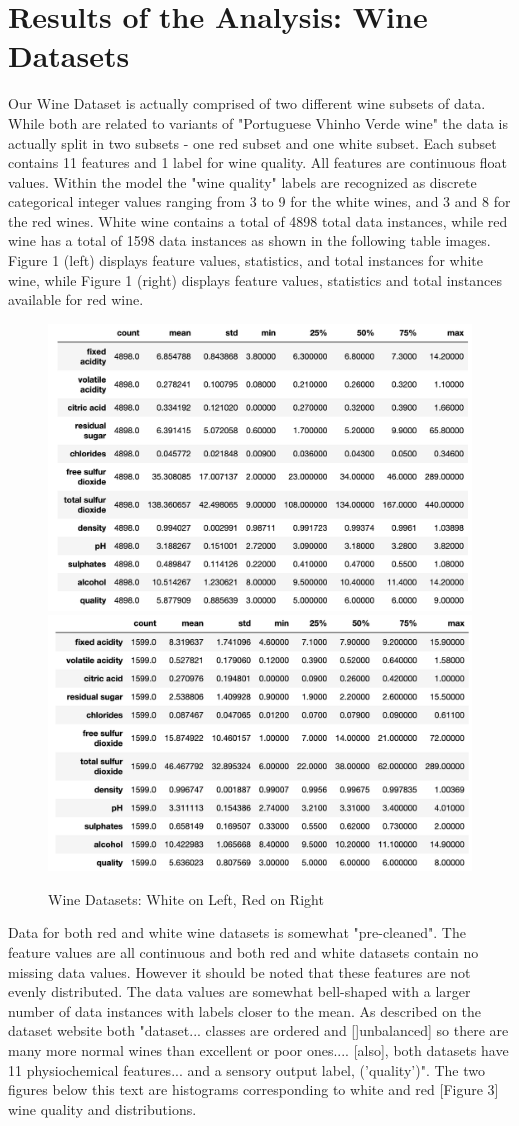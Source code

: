 \documentclass[titlepage]{article}
\begin{document}
\section*{Results of the Analysis: Wine Datasets}
Our Wine Dataset is actually comprised of two different wine subsets of data.  While both are related to variants of \cite{dataset2} "Portuguese Vhinho Verde wine" the data is actually split in two subsets - one red subset and one white subset.  Each subset contains 11 features and 1 label for wine quality.   All features are continuous float values.  Within the model the "wine quality" labels are recognized as discrete categorical integer values ranging from 3 to 9 for the white wines, and 3 and 8 for the red wines.  White wine contains a total of 4898 total data instances, while red wine has a total of 1598 data instances as shown in the following table images. Figure 1 (left) displays feature values, statistics, and total instances for white wine, while Figure 1 (right) displays feature values, statistics and total instances available for red wine.

\begin{figure}
	\centering
	\includegraphics[width=.45\textwidth]{img/whitestats.png}
	\includegraphics[width=.45\textwidth]{img/redstats.png}
	\caption{ Wine Datasets:  White on Left, Red on Right}
\end{figure}


\noindent Data for both red and white wine datasets is somewhat "pre-cleaned".   The feature values are all continuous and both red and white datasets contain no missing data values.  However it should be noted that these features are not evenly distributed.  The data values are somewhat bell-shaped with a larger number of data instances with labels closer to the mean.  As described on the dataset website \cite{dataset2} both "dataset... classes are ordered and []unbalanced] so there are many more normal wines than excellent or poor ones.... [also], both datasets have 11 physiochemical features... and a sensory output label, ('quality')".  The two figures below this text are histograms corresponding to white and red [Figure 3] wine quality and distributions.  
\end{document}
